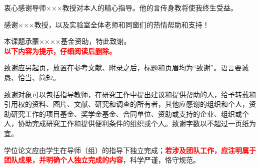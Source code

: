 
\begin{acknowledgements}

衷心感谢导师×××教授对本人的精心指导。他的言传身教将使我终生受益。

感谢×××教授，以及实验室全体老师和同窗们的热情帮助和支持！

本课题承蒙××××基金资助，特此致谢。\\

\textcolor{red}{\textbf{以下内容为提示，仔细阅读后删除。}}

致谢应另起页，放置在参考文献、附录之后，标题和页眉均为“致谢”。语言要诚恳、恰当、简短。

致谢对象可以包括指导教师，在研究工作中提出建议和提供帮助的人，给予转载和引用权的资料、图片、文献、研究和调查的所有者，其他应感谢的组织和个人，资助研究工作的项目基金、奖学金基金、合同单位、资助或支持的企业、组织或个人，协助完成研究工作和提供便利条件的组织或个人。致谢字数以不超过一页纸为宜。

学位论文应由学生在导师（组）的指导下独立完成；\textcolor{red}{\textbf{若涉及团队工作，应注明属于团队成果，并明确个人独立完成的内容}}，科学严谨，恪守规范。

\end{acknowledgements}
